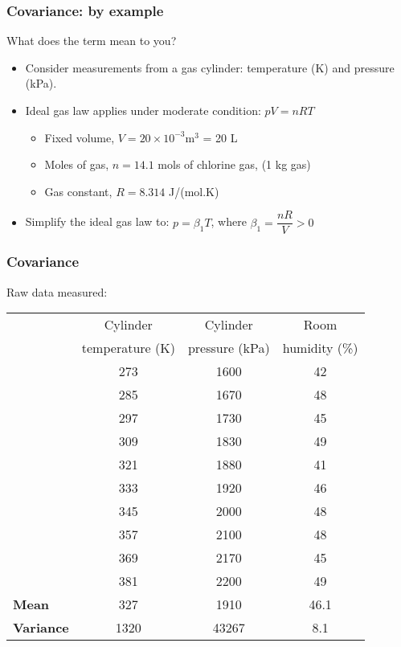 \begin{frame}\frametitle{Covariance: by example}
	
	\begin{exampleblock}{}
		What does the term {\color{purple}{covariance}} mean to you?
	\end{exampleblock}

	
	\begin{itemize}
		\item	Consider measurements from a gas cylinder: temperature (K) and pressure (kPa).
		\item	Ideal gas law applies under moderate condition: $pV = nRT$
		\begin{itemize}
			\item	Fixed volume, $V = 20 \times 10^{-3} \text{m}^3$ = 20 L
			\item	Moles of gas, $n = 14.1$ mols of chlorine gas, (1 kg gas)
			\item	Gas constant, $R = 8.314$ J/(mol.K)
		\end{itemize}
	\end{itemize}
	\begin{itemize}
		\item	Simplify the ideal gas law to: $p=\beta_1 T$, where $\beta_1 = \dfrac{nR}{V} > 0$
	\end{itemize}
\end{frame}

\begin{frame}\frametitle{Covariance}

	Raw data measured:
	\begin{table}
		[ht] \centering
		\begin{tabular}
			{l c c c} \hline\hline &Cylinder & Cylinder & Room \\
			[0.5ex] &temperature (K) & pressure (kPa) & humidity (\%) \\
			[0.5ex] \hline & 273& 1600& 42\\
			& 285& 1670& 48\\
			& 297& 1730& 45\\
			& 309& 1830& 49\\
			& 321& 1880& 41\\
			& 333& 1920& 46\\
			& 345& 2000& 48\\
			& 357& 2100& 48\\
			& 369& 2170& 45\\
			& 381& 2200& 49\\
			\hline \textbf{Mean}& 327& 1910& 46.1\\
			\textbf{Variance} & 1320 & 43267 & 8.1\\
			\hline
		\end{tabular}
	\end{table}
\end{frame}

